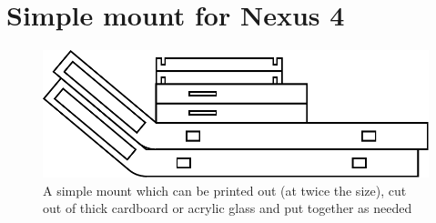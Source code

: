 \documentclass[english,bt]{package/lmedoc}
\begin{document}
\appendix
\cleardoublepage
\chapter{Simple mount for Nexus 4}
\label{appendix-mount}
\vspace{2cm}
\begin{figure}[h!]
    \center
    \includegraphics{images/halter.pdf}
    \caption{A simple mount which can be printed out (at twice the size), cut out of thick cardboard or acrylic glass and put together as needed}
\end{figure}
\cleardoublepage

\cleardoublepage
\cleardoublepage
\end{document}

